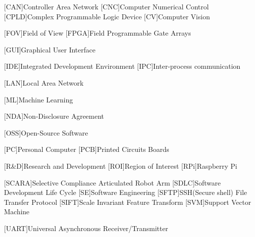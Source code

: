 \begin{acronym}
	[CAN]{Controller Area Network}
	[CNC]{Computer Numerical Control}
	[CPLD]{Complex Programmable Logic Device}
	[CV]{Computer Vision}
	
	[FOV]{Field of View}
	[FPGA]{Field Programmable Gate Arrays}
	
	[GUI]{Graphical User Interface}
	
	[IDE]{Integrated Development Environment}
	[IPC]{Inter-process communication}
	
	[LAN]{Local Area Network}
	
	[ML]{Machine Learning}
	
	[NDA]{Non-Disclosure Agreement}
	
	[OSS]{Open-Source Software}
	
	[PC]{Personal Computer}
	[PCB]{Printed Circuits Boards}
	
	[R\&D]{Research and Development}
	[ROI]{Region of Interest}
	[RPi]{Raspberry Pi}
			
	[SCARA]{Selective Compliance Articulated Robot Arm}
	[SDLC]{Software Development Life Cycle}
	[SE]{Software Engineering}
	[SFTP]{SSH(Secure shell) File Transfer Protocol}
	[SIFT]{Scale Invariant Feature Transform}
	[SVM]{Support Vector Machine}
	
	[UART]{Universal Asynchronous Receiver/Transmitter}
\end{acronym}

